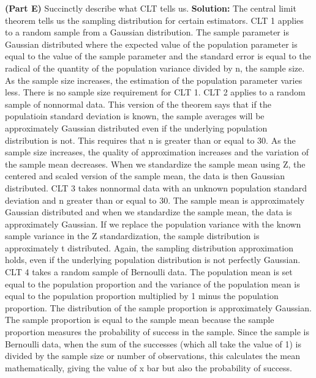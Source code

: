 \documentclass{article}
\begin{document}
\begin{enumerate}
\textbf{(Part E)} Succinctly describe what CLT tells us.
\newline
\newline
\textbf{Solution:}
The central limit theorem tells us the sampling distribution for certain estimators. 
\newline
\newline
CLT 1 applies to a random sample from a Gaussian distribution. The sample parameter is Gaussian distributed where the expected value of the population parameter is equal to the value of the sample parameter and the standard error is equal to the radical of the quantity of the population variance divided by n, the sample size. As the sample size increases, the estimation of the population parameter varies less. There is no sample size requirement for CLT 1.
\newline
\newline
CLT 2 applies to a random sample of nonnormal data. This version of the theorem says that if the populatioin standard deviation is known, the sample averages will be approximately Gaussian distributed even if the underlying population distribution is not. This requires that n is greater than or equal to 30. As the sample size increases, the quality of approximation increases and the variation of the sample mean decreases. When we standardize the sample mean using Z, the centered and scaled version of the sample mean, the data is then Gaussian distributed. 
\newline
\newline
CLT 3 takes nonnormal data with an unknown population standard deviation and n greater than or equal to 30. The sample mean is approximately Gaussian distributed and when we standardize the sample mean, the data is approximately Gaussian. If we replace the population variance with the known sample variance in the Z standardization, the sample distribution is approximately t distributed. Again, the sampling distribution approximation holds, even if the underlying population distribution is not perfectly Gaussian.
CLT 4 takes a random sample of Bernoulli data. The population mean is set equal to the population proportion and the variance of the population mean is equal to the population proportion multiplied by 1 minus the population proportion. The distribution of the sample proportion is approximately Gaussian. The sample proportion is equal to the sample mean because the sample proportion measures the probability of success in the sample. Since the sample is Bernoulli data, when the sum of the successes (which all take the value of 1) is divided by the sample size or number of observations, this calculates the mean mathematically, giving the value of x bar but also the probability of success. 

\end{enumerate}
\end{document}
